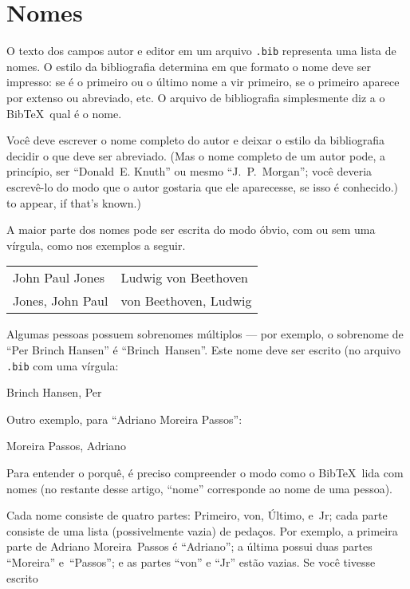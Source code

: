 \documentclass[article,openany]{memoir}
\newcommand*{\extensao}[1]{\texttt{#1}}
\newenvironment{exemplo}{\begin{center}}{\end{center}}
\begin{document}
\chapter{Nomes}

O texto dos campos autor e editor em um arquivo \extensao{.bib}
representa uma lista de nomes. O estilo da bibliografia determina em
que formato o nome deve ser impresso: se é o primeiro ou o último nome
a vir primeiro, se o primeiro aparece por extenso ou abreviado, etc. O
arquivo de bibliografia simplesmente diz a o Bib\TeX\ qual é o nome.

Você deve escrever o nome completo do autor e deixar o estilo da
bibliografia decidir o que deve ser abreviado. (Mas o nome completo de
um autor pode, a princípio, ser ``Donald~E. Knuth'' ou mesmo
``J.~P.~Morgan''; você deveria escrevê-lo do modo que o autor gostaria
que ele aparecesse, se isso é conhecido.)  to appear, if that's
known.)

A maior parte dos nomes pode ser escrita do modo óbvio, com ou sem uma vírgula, como nos exemplos a seguir.
\begin{exemplo}
\begin{tabular}{p{5cm}l}
John Paul Jones  &  Ludwig von Beethoven \\
Jones, John Paul &  von Beethoven, Ludwig
\end{tabular}
\end{exemplo}


Algumas pessoas possuem sobrenomes múltiplos --- por exemplo, o
sobrenome de ``Per Brinch Hansen'' é ``Brinch~Hansen''. Este nome deve
ser escrito (no arquivo \extensao{.bib} com uma vírgula:

\begin{exemplo}
Brinch Hansen, Per
\end{exemplo}

Outro exemplo, para ``Adriano Moreira Passos'':

\begin{exemplo}
Moreira Passos, Adriano
\end{exemplo}

Para entender o porquê, é preciso compreender o modo como o
Bib\TeX\ lida com nomes (no restante desse artigo, ``nome''
corresponde ao nome de uma pessoa).

Cada nome consiste de quatro partes: Primeiro, von, Último, e~Jr; cada
parte consiste de uma lista (possivelmente vazia) de pedaços.  Por
exemplo, a primeira parte de Adriano Moreira~Passos é ``Adriano''; a
última possui duas partes ``Moreira'' e~``Passos''; e as partes
``von'' e ``Jr'' estão vazias. Se você tivesse escrito
\end{document}
